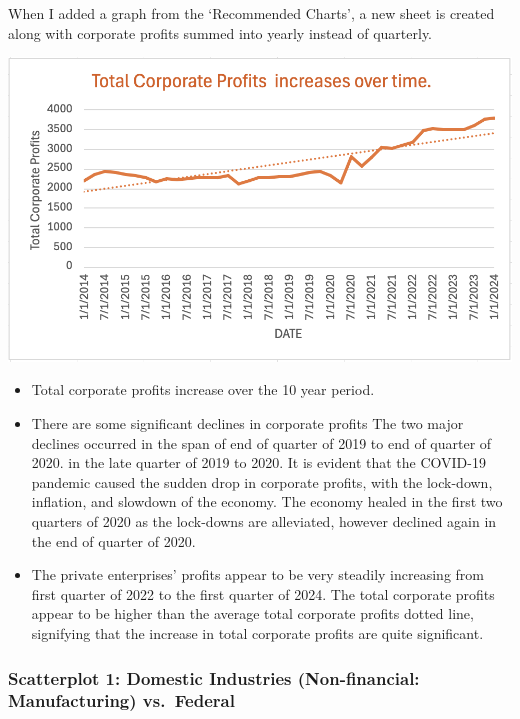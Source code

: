 \documentclass[
  letterpaper,
  DIV=11,
  numbers=noendperiod]{scrreprt}
\providecommand{\tightlist}{%
  \setlength{\itemsep}{0pt}\setlength{\parskip}{0pt}}\usepackage{longtable,booktabs,array}
\begin{document}
When I added a graph from the `Recommended Charts', a new sheet is
created along with corporate profits summed into yearly instead of
quarterly.

\includegraphics{./Excel_1_Unit/Week1_Janice/Week 1/Week 1 Friday/Linechart.png}

\begin{itemize}
\tightlist
\item
  Total corporate profits increase over the 10 year period.
\item
  There are some significant declines in corporate profits The two major
  declines occurred in the span of end of quarter of 2019 to end of
  quarter of 2020. in the late quarter of 2019 to 2020. It is evident
  that the COVID-19 pandemic caused the sudden drop in corporate
  profits, with the lock-down, inflation, and slowdown of the economy.
  The economy healed in the first two quarters of 2020 as the lock-downs
  are alleviated, however declined again in the end of quarter of 2020.
\item
  The private enterprises' profits appear to be very steadily increasing
  from first quarter of 2022 to the first quarter of 2024. The total
  corporate profits appear to be higher than the average total corporate
  profits dotted line, signifying that the increase in total corporate
  profits are quite significant.
\end{itemize}

\subsubsection{Scatterplot 1: Domestic Industries (Non-financial:
Manufacturing)
vs.~Federal}\label{scatterplot-1-domestic-industries-non-financial-manufacturing-vs.-federal}
\end{document}
